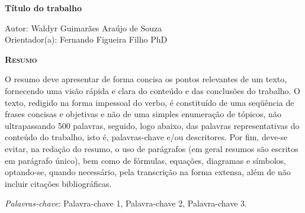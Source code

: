 \begin{center}
	{\Large{\textbf{Título do trabalho}}}
\end{center}

\vspace{1cm}

\begin{flushright}
	Autor: Waldyr Guimarães Araújo de Souza\\
	Orientador(a): Fernando Figueira Filho PhD
\end{flushright}

\vspace{1cm}

\begin{center}
	\Large{\textsc{\textbf{Resumo}}}
\end{center}

\noindent O resumo deve apresentar de forma concisa os pontos relevantes de um texto, fornecendo uma visão rápida e clara do conteúdo e das conclusões do trabalho. O texto, redigido na forma impessoal do verbo, é constituído de uma seqüência de frases concisas e objetivas e não de uma simples enumeração de tópicos, não ultrapassando 500 palavras, seguido, logo abaixo, das palavras representativas do conteúdo do trabalho, isto é, palavras-chave e/ou descritores. Por fim, deve-se evitar, na redação do resumo, o uso de parágrafos (em geral resumos são escritos em parágrafo único), bem como de fórmulas, equações, diagramas e símbolos, optando-se, quando necessário, pela transcrição na forma extensa, além de não incluir citações bibliográficas.

\noindent\textit{Palavras-chave}: Palavra-chave 1, Palavra-chave 2, Palavra-chave 3.